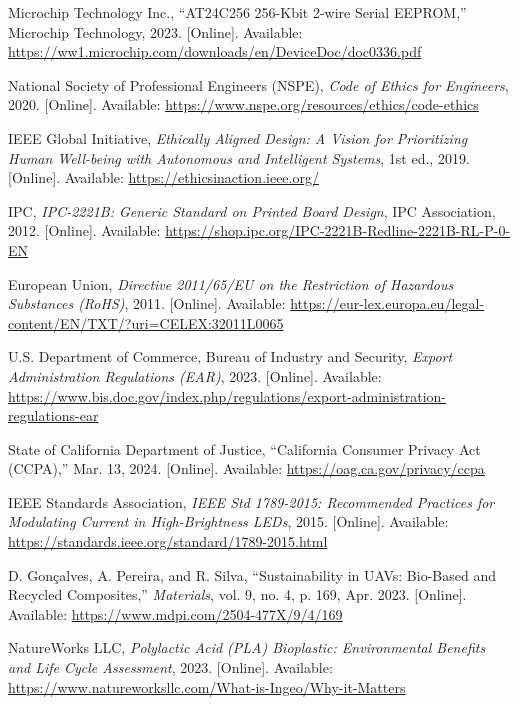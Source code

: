\documentclass[12pt]{article}
\begin{document}
\begin{thebibliography}{99}
Microchip Technology Inc., ``AT24C256 256-Kbit 2-wire Serial EEPROM,'' Microchip Technology, 2023. [Online]. Available: \url{https://ww1.microchip.com/downloads/en/DeviceDoc/doc0336.pdf}

National Society of Professional Engineers (NSPE), \emph{Code of Ethics for Engineers}, 2020. [Online]. Available: \url{https://www.nspe.org/resources/ethics/code-ethics}

IEEE Global Initiative, \emph{Ethically Aligned Design: A Vision for Prioritizing Human Well-being with Autonomous and Intelligent Systems}, 1st ed., 2019. [Online]. Available: \url{https://ethicsinaction.ieee.org/}

IPC, \emph{IPC-2221B: Generic Standard on Printed Board Design}, IPC Association, 2012. [Online]. Available: \url{https://shop.ipc.org/IPC-2221B-Redline-2221B-RL-P-0-EN}

European Union, \emph{Directive 2011/65/EU on the Restriction of Hazardous Substances (RoHS)}, 2011. [Online]. Available: \url{https://eur-lex.europa.eu/legal-content/EN/TXT/?uri=CELEX:32011L0065}

U.S. Department of Commerce, Bureau of Industry and Security, \emph{Export Administration Regulations (EAR)}, 2023. [Online]. Available: \url{https://www.bis.doc.gov/index.php/regulations/export-administration-regulations-ear}

State of California Department of Justice, “California Consumer Privacy Act (CCPA),” Mar. 13, 2024. [Online]. Available: \url{https://oag.ca.gov/privacy/ccpa}

IEEE Standards Association, \emph{IEEE Std 1789-2015: Recommended Practices for Modulating Current in High-Brightness LEDs}, 2015. [Online]. Available: \url{https://standards.ieee.org/standard/1789-2015.html}

D. Gonçalves, A. Pereira, and R. Silva, “Sustainability in UAVs: Bio-Based and Recycled Composites,” \emph{Materials}, vol. 9, no. 4, p. 169, Apr. 2023. [Online]. Available: \url{https://www.mdpi.com/2504-477X/9/4/169}

NatureWorks LLC, \emph{Polylactic Acid (PLA) Bioplastic: Environmental Benefits and Life Cycle Assessment}, 2023. [Online]. Available: \url{https://www.natureworksllc.com/What-is-Ingeo/Why-it-Matters}

\end{thebibliography}

\end{document}
